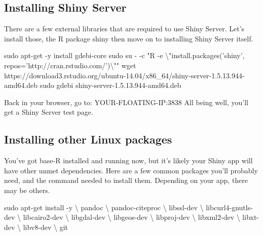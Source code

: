 \documentclass[
]{book}
\newenvironment{Shaded}{\begin{snugshade}}{\end{snugshade}}
\newcommand{\DataTypeTok}[1]{\textcolor[rgb]{0.13,0.29,0.53}{#1}}
\newcommand{\FunctionTok}[1]{\textcolor[rgb]{0.00,0.00,0.00}{#1}}
\newcommand{\NormalTok}[1]{#1}
\newcommand{\StringTok}[1]{\textcolor[rgb]{0.31,0.60,0.02}{#1}}
\begin{document}
\hypertarget{installing-shiny-server}{%
\subsection{Installing Shiny Server}\label{installing-shiny-server}}

There are a few external libraries that are required to use Shiny Server. Let's install those, the R package shiny then move on to installing Shiny Server itself.

\begin{Shaded}
\begin{Highlighting}[]

\FunctionTok{sudo}\NormalTok{ apt-get -y install gdebi-core}
\FunctionTok{sudo}\NormalTok{ su - -c }\StringTok{"R -e }\DataTypeTok{\textbackslash{}"}\StringTok{install.packages('shiny', repos='http://cran.rstudio.com/')}\DataTypeTok{\textbackslash{}"}\StringTok{"}
\FunctionTok{wget}\NormalTok{ https://download3.rstudio.org/ubuntu-14.04/x86_64/shiny-server-1.5.13.944-amd64.deb}
\FunctionTok{sudo}\NormalTok{ gdebi shiny-server-1.5.13.944-amd64.deb}
\end{Highlighting}
\end{Shaded}

Back in your browser, go to: YOUR-FLOATING-IP:3838
All being well, you'll get a Shiny Server test page.

\hypertarget{installing-other-linux-packages}{%
\subsection{Installing other Linux packages}\label{installing-other-linux-packages}}

You've got base-R installed and running now, but it's likely your Shiny app will have other unmet dependencies. Here are a few common packages you'll probably need, and the command needed to install them. Depending on your app, there may be others.

\begin{Shaded}
\begin{Highlighting}[]

\FunctionTok{sudo}\NormalTok{ apt-get install -y \textbackslash{}}
\NormalTok{    pandoc \textbackslash{}}
\NormalTok{    pandoc-citeproc \textbackslash{}}
\NormalTok{    libssl-dev \textbackslash{}}
\NormalTok{    libcurl4-gnutls-dev \textbackslash{}}
\NormalTok{    libcairo2-dev \textbackslash{}}
\NormalTok{    libgdal-dev \textbackslash{}}
\NormalTok{    libgeos-dev \textbackslash{}}
\NormalTok{    libproj-dev \textbackslash{}}
\NormalTok{    libxml2-dev \textbackslash{}}
\NormalTok{    libxt-dev \textbackslash{}}
\NormalTok{    libv8-dev \textbackslash{}}
\NormalTok{    git}
\end{Highlighting}
\end{Shaded}
\end{document}
